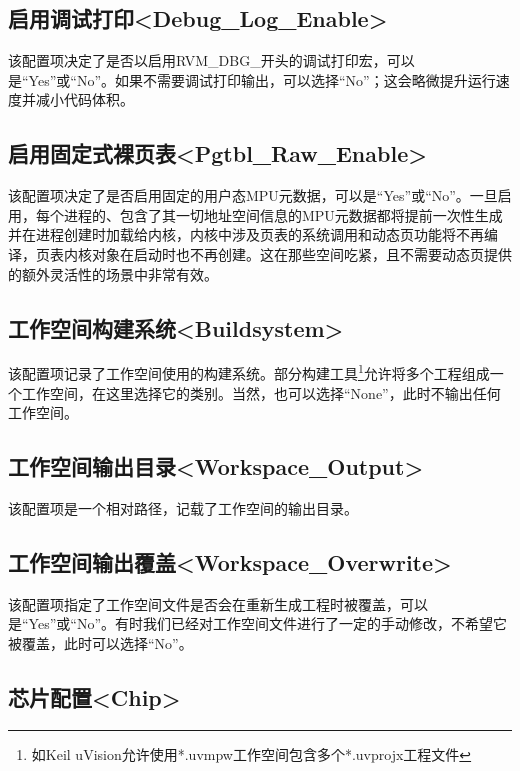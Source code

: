 \subsection{启用调试打印<Debug\_Log\_Enable>{}}\label{subsec:5-3-4}

该配置项决定了是否以启用RVM\_DBG\_开头的调试打印宏，可以是``Yes''或``No''。如果不需要调试打印输出，可以选择``No''；这会略微提升运行速度并减小代码体积。

\subsection{启用固定式裸页表<Pgtbl\_Raw\_Enable>{}}\label{subsec:5-3-5}

该配置项决定了是否启用固定的用户态MPU元数据，可以是``Yes''或``No''。一旦启用，每个进程的、包含了其一切地址空间信息的MPU元数据都将提前一次性生成并在进程创建时加载给内核，内核中涉及页表的系统调用和动态页功能将不再编译，页表内核对象在启动时也不再创建。这在那些空间吃紧，且不需要动态页提供的额外灵活性的场景中非常有效。

\subsection{工作空间构建系统<Buildsystem>{}}\label{subsec:5-3-6}

该配置项记录了工作空间使用的构建系统。部分构建工具\footnote{如Keil uVision允许使用*.uvmpw工作空间包含多个*.uvprojx工程文件}允许将多个工程组成一个工作空间，在这里选择它的类别。当然，也可以选择``None''，此时不输出任何工作空间。

\subsection{工作空间输出目录<Workspace\_Output>{}}\label{subsec:5-3-7}

该配置项是一个相对路径，记载了工作空间的输出目录。

\subsection{工作空间输出覆盖<Workspace\_Overwrite>{}}\label{subsec:5-3-8}

该配置项指定了工作空间文件是否会在重新生成工程时被覆盖，可以是``Yes''或``No''。有时我们已经对工作空间文件进行了一定的手动修改，不希望它被覆盖，此时可以选择``No''。

\subsection{芯片配置<Chip>{}}\label{subsec:5-3-9}

